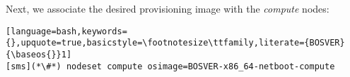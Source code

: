 Next, we associate the desired provisioning image with the {\em compute} nodes:

\begin{lstlisting}[language=bash,keywords={},upquote=true,basicstyle=\footnotesize\ttfamily,literate={BOSVER}{\baseos{}}1]
[sms](*\#*) nodeset compute osimage=BOSVER-x86_64-netboot-compute
\end{lstlisting}

